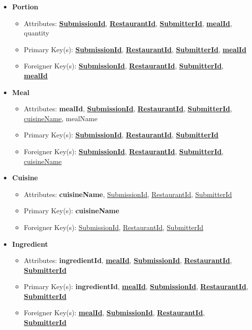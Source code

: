 \documentclass{article}
\begin{document}
\begin{itemize}
        \item \textbf{Portion}
        \begin{itemize}
            \item Attributes: \textbf{\underline{SubmissionId}}, \textbf{\underline{RestaurantId}}, \textbf{\underline{SubmitterId}}, \textbf{\underline{mealId}}, quantity
            \item Primary Key(s): \textbf{\underline{SubmissionId}}, \textbf{\underline{RestaurantId}}, \textbf{\underline{SubmitterId}}, \textbf{\underline{mealId}}
            \item Foreigner Key(s): \textbf{\underline{SubmissionId}}, \textbf{\underline{RestaurantId}}, \textbf{\underline{SubmitterId}}, \textbf{\underline{mealId}}
        \end{itemize}

        \item \textbf{Meal}
        \begin{itemize}
            \item Attributes: \textbf{mealId}, \textbf{\underline{SubmissionId}}, \textbf{\underline{RestaurantId}}, \textbf{\underline{SubmitterId}}, \underline{cuisineName}, mealName
            \item Primary Key(s): \textbf{\underline{SubmissionId}}, \textbf{\underline{RestaurantId}}, \textbf{\underline{SubmitterId}}
            \item Foreigner Key(s): \textbf{\underline{SubmissionId}}, \textbf{\underline{RestaurantId}}, \textbf{\underline{SubmitterId}}, \underline{cuisineName}
        \end{itemize}

        \item \textbf{Cuisine}
        \begin{itemize}
            \item Attributes: \textbf{cuisineName}, \underline{SubmissionId}, \underline{RestaurantId}, \underline{SubmitterId}
            \item Primary Key(s): \textbf{cuisineName}
            \item Foreigner Key(s): \underline{SubmissionId}, \underline{RestaurantId}, \underline{SubmitterId}
        \end{itemize}

        \item \textbf{Ingredient}
        \begin{itemize}
            \item Attributes: \textbf{ingredientId}, \textbf{\underline{mealId}}, \textbf{\underline{SubmissionId}}, \textbf{\underline{RestaurantId}}, \textbf{\underline{SubmitterId}}
            \item Primary Key(s): \textbf{ingredientId}, \textbf{\underline{mealId}}, \textbf{\underline{SubmissionId}}, \textbf{\underline{RestaurantId}}, \textbf{\underline{SubmitterId}}
            \item Foreigner Key(s): \textbf{\underline{mealId}}, \textbf{\underline{SubmissionId}}, \textbf{\underline{RestaurantId}}, \textbf{\underline{SubmitterId}}
        \end{itemize}

    \end{itemize}    
    
\end{document}
